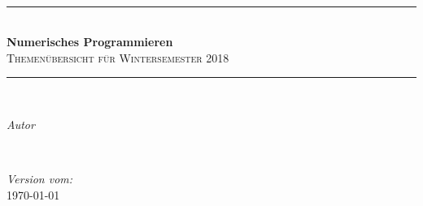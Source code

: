 
\begin{titlepage} %
	\newcommand{\HRule}{\rule{\linewidth}{0.5mm}} %
	
	\center %
	
	
	
	\hspace{1cm} \\[3.5cm]
	
	
	\HRule\\[0.4cm]
	
	{\huge\bfseries Numerisches Programmieren}\\[0.4cm] %
	
	\textsc{\Large Themenübersicht für Wintersemester 2018}\\[0.5cm] %
	
	\HRule\\[1.5cm]
	
	
	\begin{minipage}{0.4\textwidth}
		\begin{flushleft}
			\large
			\textit{Autor}\\
			\textsc{\npauthor{}} %
		\end{flushleft}
	\end{minipage}
	~
	\begin{minipage}{0.4\textwidth}
		\begin{flushright}
			\large
			\textit{Version vom:}\\
			\textsc{\today} %
		\end{flushright}
	\end{minipage}
	
	

\end{titlepage}
